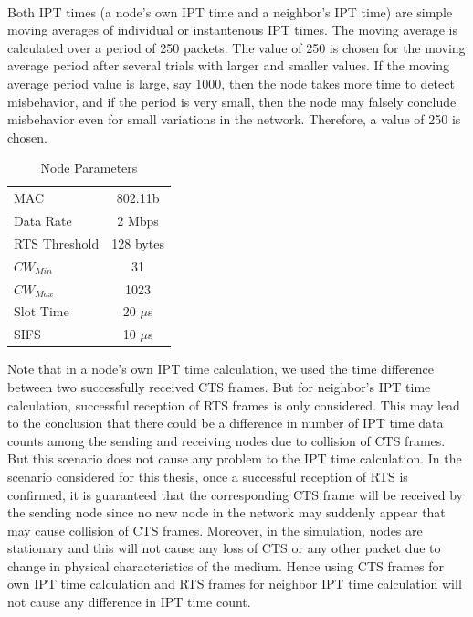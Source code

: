 \documentclass[12pt,letterpaper,english]{article}
\begin{document}
\\
\indent Both IPT times (a node's own IPT time and a neighbor's IPT time) are simple moving averages of individual or instantenous IPT times. The moving average is calculated over a period of 250 packets. The value of 250 is chosen for the moving average period after several trials with larger and smaller values. If the moving average period value is large, say 1000, then the node takes more time to detect misbehavior, and if the period is very small, then the node may falsely conclude misbehavior even for small variations in the network. Therefore, a value of 250 is chosen.
\begin{table}[H]
\caption{Node Parameters}
\label{table:nodeparameters}
\begin{center}
\begin{tabular}{l c}
\hline
\hline
MAC & 802.11b\\
Data Rate & 2 Mbps\\
RTS Threshold & 128 bytes\\
$CW_{Min}$ & 31\\
$CW_{Max}$ & 1023\\
Slot Time & 20 $\mu$s\\
SIFS & 10 $\mu$s\\
\hline
\end{tabular}
\end{center}
\end{table}
\indent Note that in a node's own IPT time calculation, we used the time difference between two successfully received CTS frames. But for neighbor's IPT time calculation, successful reception of RTS frames is only considered. This may lead to the conclusion that there could be a difference in number of IPT time data counts among the sending and receiving nodes due to collision of CTS frames. But this scenario does not cause any problem to the IPT time calculation. In the scenario considered for this thesis, once a successful reception of RTS is confirmed, it is guaranteed that the corresponding CTS frame will be received by the sending node since no new node in the network may suddenly appear that may cause collision of CTS frames. Moreover, in the simulation, nodes are stationary and this will not cause any loss of CTS or any other packet due to change in physical characteristics of the medium. Hence using CTS frames for own IPT time calculation and RTS frames for neighbor IPT time calculation will not cause any difference in IPT time count. 
\end{document}
